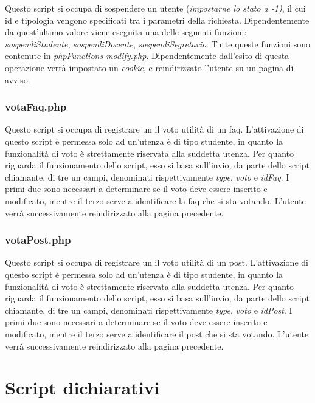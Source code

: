 \documentclass [a4paper,11pt]{book}
\begin{document}
Questo script si occupa di sospendere un utente (\emph{impostarne lo stato a -1)}, il cui id e tipologia vengono specificati tra i parametri della richiesta. Dipendentemente da quest'ultimo valore viene eseguita una delle seguenti funzioni: \emph{sospendiStudente}, \emph{sospendiDocente}, \emph{sospendiSegretario}. Tutte queste funzioni sono contenute in \emph{phpFunctions-modify.php}.
Dipendentemente dall'esito di questa operazione verrà impostato un \emph{cookie}, e reindirizzato l'utente su un pagina di avviso. 

\medskip

\subsubsection{votaFaq.php}

Questo script si occupa di registrare un il voto utilità di un faq. L'attivazione di questo script è permessa solo ad un'utenza è di tipo studente, in quanto la funzionalità di voto è strettamente riservata alla suddetta utenza.
Per quanto riguarda il funzionamento dello script, esso si basa sull'invio, da parte dello script chiamante, di tre un campi,  denominati rispettivamente \emph{type}, \emph{voto} e \emph{idFaq}. I primi due sono necessari a determinare se il voto deve essere inserito e modificato, mentre il terzo serve a identificare la faq che si sta votando.
L'utente verrà successivamente reindirizzato alla pagina precedente.
\medskip

\subsubsection{votaPost.php}

Questo script si occupa di registrare un il voto utilità di un post. L'attivazione di questo script è permessa solo ad un'utenza è di tipo studente, in quanto la funzionalità di voto è strettamente riservata alla suddetta utenza.
Per quanto riguarda il funzionamento dello script, esso si basa sull'invio, da parte dello script chiamante, di tre un campi,  denominati rispettivamente \emph{type}, \emph{voto} e \emph{idPost}. I primi due sono necessari a determinare se il voto deve essere inserito e modificato, mentre il terzo serve a identificare il post che si sta votando.
L'utente verrà successivamente reindirizzato alla pagina precedente.
\medskip

\section{Script dichiarativi}
\end{document}
